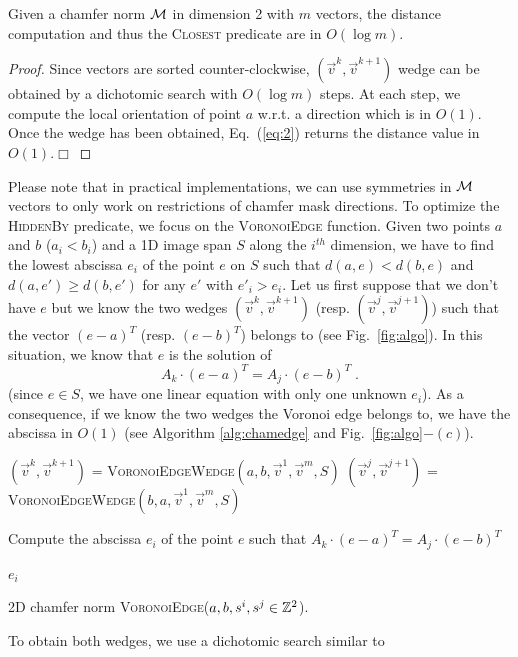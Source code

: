 \documentclass{llncs}
\begin{document}
\begin{lemma}
\label{lem:log}
  Given a chamfer norm $\mathcal{M}$ in dimension 2 with $m$ vectors, the distance computation
  and thus the \textsc{Closest} predicate are in $O(\log{m})$.
\end{lemma}
\begin{proof}
  Since vectors are sorted counter-clockwise,
  $(\vec{v}^k,\vec{v}^{k+1})$ wedge can be obtained by a dichotomic
  search with $O(\log{m})$ steps. At each step, we compute the local
  orientation of point $a$ w.r.t. a direction which is in $O(1)$. Once
  the wedge has been obtained, Eq.~(\ref{eq:2}) returns the distance
  value in $O(1)$.$\Box$
\end{proof}

Please note that in practical implementations, we can use symmetries
in $\mathcal{M}$ vectors to only work on restrictions of chamfer mask
directions.  To optimize the \textsc{HiddenBy} predicate, we focus on
the \textsc{VoronoiEdge} function. Given two points $a$ and $b$
($a_i<b_i$) and a 1D image span $S$ along the $i^{th}$ dimension, we
have to find the lowest abscissa $e_i$ of the point $e$ on $S$ such
that $d(a,e) < d(b,e)$ and $d(a,e')\geq d(b, e')$ for any $e'$ with
$e'_i>e_i$.
Let us first suppose that we don't have $e$ but we know the two wedges
$(\vec{v}^{k},\vec{v}^{k+1})$ (resp. $(\vec{v}^j,\vec{v}^{j+1})$) such
that the vector $(e-a)^T$ (resp. $(e-b)^T$) belongs to (see
Fig.~\ref{fig:algo}). In this situation, we know that $e$ is the
solution of
\begin{equation}
\label{eq:3}
  A_k\cdot  (e-a)^T = A_j\cdot (e -b)^T\;.
\end{equation}
(since $e\in S$, we have one linear equation with only one unknown
$e_i$). As a consequence, if we know the two wedges the Voronoi edge
belongs to, we have the abscissa in $O(1)$ (see Algorithm
\ref{alg:chamedge} and Fig.~\ref{fig:algo}$-(c)$).
\begin{algorithm}[h]\footnotesize
  $(\vec{v}^k,\vec{v}^{k+1})$ = \textsc{VoronoiEdgeWedge}$(a,b,\vec{v}^1,\vec{v}^m, S)$\;
  $(\vec{v}^j,\vec{v}^{j+1})$ = \textsc{VoronoiEdgeWedge}$(b,a,\vec{v}^1,\vec{v}^m, S)$\;

  Compute the abscissa $e_i$ of the point $e$ such that $A_k\cdot
  (e-a)^T = A_j\cdot (e -b)^T$\;

  \Return $e_i$\;
  \caption{\footnotesize
2D chamfer norm \textsc{VoronoiEdge}($a,b,s^i,s^j\in{\mathbb{Z}}^2$).\label{alg:chamedge}}
\end{algorithm}
To obtain both wedges, we use a dichotomic search similar to
\end{document}
